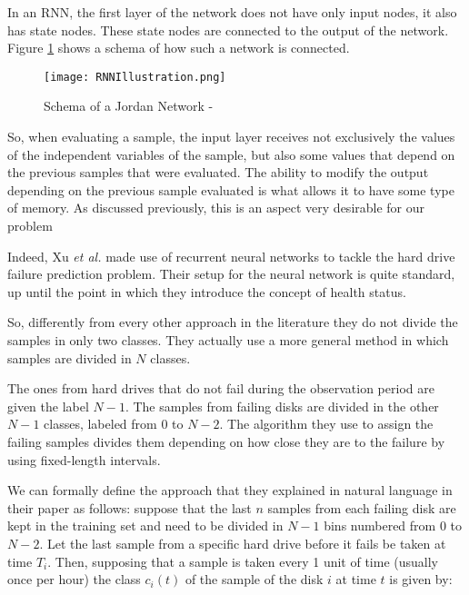 In an RNN, the first layer of the network does not have only input nodes, it also has state nodes.
These state nodes are connected to the output of the network.
Figure \ref{fig:RNNIllustration} shows a schema of how such a network is connected.

\begin{figure}
    \begin{center}
        \texttt{[image: RNNIllustration.png]}
        \caption[Schema of a Jordan Network]{Schema of a Jordan Network - \cite{elman1990finding}}
        \label{fig:RNNIllustration}
    \end{center}
\end{figure}

So, when evaluating a sample, the input layer receives not exclusively the values of the independent variables of the sample, but also some values that depend on the previous samples that were evaluated.
The ability to modify the output depending on the previous sample evaluated is what allows it to have some type of memory.
As discussed previously, this is an aspect very desirable for our problem

Indeed, Xu \textit{et al.} \cite{Xu16} made use of recurrent neural networks to tackle the hard drive failure prediction problem.
Their setup for the neural network is quite standard, up until the point in which they introduce the concept of health status.

So, differently from every other approach in the literature they do not divide the samples in only two classes.
They actually use a more general method in which samples are divided in $N$ classes.

The ones from hard drives that do not fail during the observation period are given the label $N-1$.
The samples from failing disks are divided in the other $N-1$ classes, labeled from $0$ to $N-2$.
The algorithm they use to assign the failing samples divides them depending on how close they are to the failure by using fixed-length intervals.

We can formally define the approach that they explained in natural language in their paper as follows:
suppose that the last $n$ samples from each failing disk are kept in the training set and need to be divided in $N-1$ bins numbered from 0 to $N-2$.
Let the last sample from a specific hard drive before it fails be taken at time $T_i$.
Then, supposing that a sample is taken every 1 unit of time (usually once per hour) the class $c_i(t)$ of the sample of the disk $i$ at time $t$ is given by:


